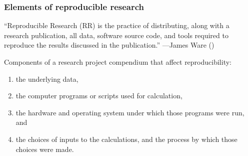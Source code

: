 \begin{frame}
    \frametitle{Elements of reproducible research}
	``Reproducible Research (RR) is the practice of distributing, along with a research publication, all data, software source code, and tools required to reproduce the results discussed in the publication.'' ---James Ware (\citeyear{Ware:2010aa})
	
	\bigskip

Components of a research project compendium that affect reproducibility:
	\begin{enumerate}
		\item the underlying data,
		\item the computer programs or scripts used for calculation,
		\item the hardware and operating system under which those programs were run, and
		\item the choices of inputs to the calculations, and the process by which those choices were made.
	\end{enumerate}
\end{frame}

